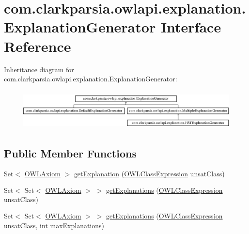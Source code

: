 \hypertarget{interfacecom_1_1clarkparsia_1_1owlapi_1_1explanation_1_1_explanation_generator}{\section{com.\-clarkparsia.\-owlapi.\-explanation.\-Explanation\-Generator Interface Reference}
\label{interfacecom_1_1clarkparsia_1_1owlapi_1_1explanation_1_1_explanation_generator}
}
Inheritance diagram for com.\-clarkparsia.\-owlapi.\-explanation.\-Explanation\-Generator\-:\begin{figure}[H]
\begin{center}
\leavevmode
\includegraphics[height=2.164948cm]{interfacecom_1_1clarkparsia_1_1owlapi_1_1explanation_1_1_explanation_generator}
\end{center}
\end{figure}
\subsection*{Public Member Functions}
\begin{DoxyCompactItemize}
\item 
Set$<$ \hyperlink{interfaceorg_1_1semanticweb_1_1owlapi_1_1model_1_1_o_w_l_axiom}{O\-W\-L\-Axiom} $>$ \hyperlink{interfacecom_1_1clarkparsia_1_1owlapi_1_1explanation_1_1_explanation_generator_a9012743a26cf0e4194a6c696744c8327}{get\-Explanation} (\hyperlink{interfaceorg_1_1semanticweb_1_1owlapi_1_1model_1_1_o_w_l_class_expression}{O\-W\-L\-Class\-Expression} unsat\-Class)
\item 
Set$<$ Set$<$ \hyperlink{interfaceorg_1_1semanticweb_1_1owlapi_1_1model_1_1_o_w_l_axiom}{O\-W\-L\-Axiom} $>$ $>$ \hyperlink{interfacecom_1_1clarkparsia_1_1owlapi_1_1explanation_1_1_explanation_generator_a49dd15f6fb8bfc4a362b89bcf73dde72}{get\-Explanations} (\hyperlink{interfaceorg_1_1semanticweb_1_1owlapi_1_1model_1_1_o_w_l_class_expression}{O\-W\-L\-Class\-Expression} unsat\-Class)
\item 
Set$<$ Set$<$ \hyperlink{interfaceorg_1_1semanticweb_1_1owlapi_1_1model_1_1_o_w_l_axiom}{O\-W\-L\-Axiom} $>$ $>$ \hyperlink{interfacecom_1_1clarkparsia_1_1owlapi_1_1explanation_1_1_explanation_generator_a2eef3ed3d955885484a065c2dd2d6b8e}{get\-Explanations} (\hyperlink{interfaceorg_1_1semanticweb_1_1owlapi_1_1model_1_1_o_w_l_class_expression}{O\-W\-L\-Class\-Expression} unsat\-Class, int max\-Explanations)
\end{DoxyCompactItemize}


